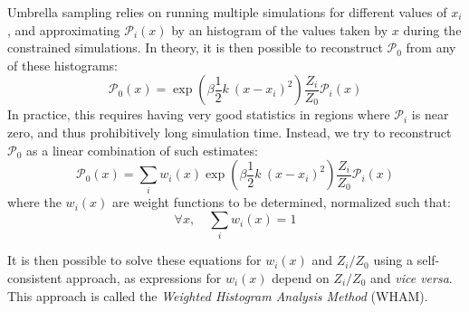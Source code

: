 \documentclass[thesis]{subfiles}
\begin{document}
Umbrella sampling relies on running multiple simulations for different values of
$x_i$, and approximating $\mathcal{P}_i(x)$ by an histogram of the values taken
by $x$ during the constrained simulations. In theory, it is then possible to
reconstruct $\mathcal{P}_0$ from any of these histograms:
\[ \mathcal{P}_0(x) = \exp\left(\beta \frac 12 k\ (x - x_i)^2\right) \frac{Z_i}{Z_0} \mathcal{P}_i(x) \]
In practice, this requires having very good statistics in regions where
$\mathcal{P}_i$ is near zero, and thus prohibitively long simulation time.
Instead, we try to reconstruct $\mathcal{P}_0$ as a linear combination of such
estimates:
\[ \mathcal{P}_0(x) = \sum_i w_i(x) \exp\left(\beta \frac 12 k\ (x - x_i)^2\right) \frac{Z_i}{Z_0} \mathcal{P}_i(x) \]
where the $w_i(x)$ are weight functions to be determined, normalized such that:
\[ \forall x, \quad \sum_i w_i(x) = 1\]

It is then possible to solve these equations for $w_i(x)$ and $Z_i/Z_0$ using a
self-consistent approach, as expressions for $w_i(x)$ depend on $Z_i/Z_0$ and
\emph{vice versa}. This approach is called the \emph{Weighted Histogram Analysis
Method}\cite{Kumar1995} (WHAM).

\OnlyInSubfile{\printglobalbibliography}
\end{document}
